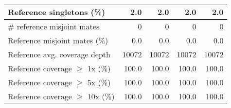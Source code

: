\documentclass[12pt,a4paper]{article}
\begin{document}
\begin{table}[ht]
\begin{center}
\begin{tabular}{|l*{4}{|r}|}
Reference singletons (\%) & 2.0 & 2.0 & 2.0 & 2.0 \\ \hline
\# reference misjoint mates & 0 & 0 & 0 & 0 \\ \hline
Reference misjoint mates (\%) & 0.0 & 0.0 & 0.0 & 0.0 \\ \hline
Reference avg. coverage depth & 10072 & 10072 & 10072 & 10072 \\ \hline
Reference coverage $\geq$ 1x (\%) & 100.0 & 100.0 & 100.0 & 100.0 \\ \hline
Reference coverage $\geq$ 5x (\%) & 100.0 & 100.0 & 100.0 & 100.0 \\ \hline
Reference coverage $\geq$ 10x (\%) & 100.0 & 100.0 & 100.0 & 100.0 \\ \hline
\end{tabular}
\end{center}
\end{table}
\end{document}
